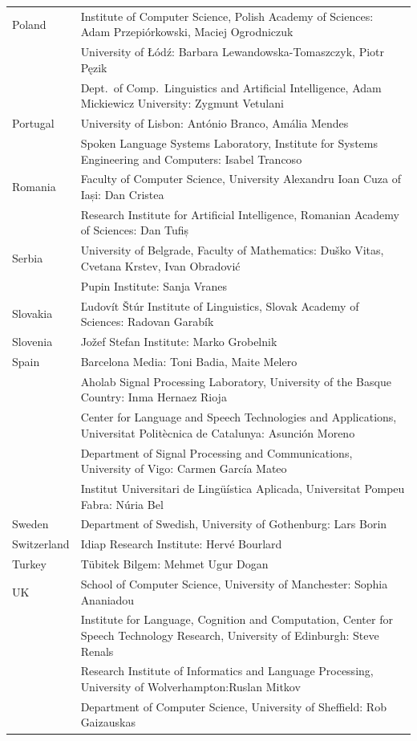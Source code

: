 \documentclass[10pt, plain]{../../metanetpaper}
\begin{document}
\begin{longtable}{@{}lp{137mm}@{}}
Poland & Institute of Computer Science, Polish Academy of Sciences: Adam Przepiórkowski, Maciej Ogrodniczuk \\ \addlinespace
& University of Łódź: Barbara Lewandowska-Tomaszczyk, Piotr Pęzik\\ \addlinespace
& Dept.~of Comp.~Linguistics and Artificial Intelligence, Adam Mickiewicz University: Zygmunt Vetulani \\ \addlinespace
Portugal & University of Lisbon: António Branco, Amália Mendes \\ \addlinespace 
& Spoken Language Systems Laboratory, Institute for Systems Engineering and Computers: Isabel Trancoso \\ \addlinespace
Romania & Faculty of Computer Science, University Alexandru Ioan Cuza of Iași: Dan Cristea \\ \addlinespace
& Research Institute for Artificial Intelligence, Romanian Academy of Sciences:  Dan Tufiș \\ \addlinespace
Serbia  & University of Belgrade, Faculty of Mathematics: Duško Vitas, Cvetana Krstev,  Ivan Obradović \\ \addlinespace
& Pupin Institute: Sanja Vranes \\ \addlinespace  
Slovakia & Ľudovít Štúr Institute of Linguistics, Slovak Academy of Sciences: Radovan Garabík \\ \addlinespace 
Slovenia & Jožef Stefan Institute: Marko Grobelnik \\ \addlinespace 
Spain & Barcelona Media: Toni Badia, Maite Melero \\ \addlinespace  
& Aholab Signal Processing Laboratory, University of the Basque Country:  Inma Hernaez Rioja \\ \addlinespace 
& Center for Language and Speech Technologies and Applications, Universitat Politècnica de Catalunya:  Asunción Moreno \\ \addlinespace 
& Department of Signal Processing and Communications, University of Vigo:  Carmen García Mateo \\ \addlinespace 
& Institut Universitari de Lingüística Aplicada, Universitat Pompeu Fabra: Núria Bel \\ \addlinespace 
Sweden & Department of Swedish, University of Gothenburg: Lars Borin \\ \addlinespace 
Switzerland & Idiap Research Institute: Hervé Bourlard \\ \addlinespace 
Turkey & Tübitek Bilgem: Mehmet Ugur Dogan \\ \addlinespace 
UK & School of Computer Science, University of Manchester: Sophia Ananiadou \\ \addlinespace  
& Institute for Language, Cognition and Computation, Center for Speech Technology Research, University of Edinburgh: Steve Renals \\ \addlinespace 
& Research Institute of Informatics and Language Processing, University of Wolverhampton:\newline Ruslan Mitkov \\ \addlinespace
& Department of Computer Science, University of Sheffield: Rob Gaizauskas\\ 
\end{longtable}
\end{document}
